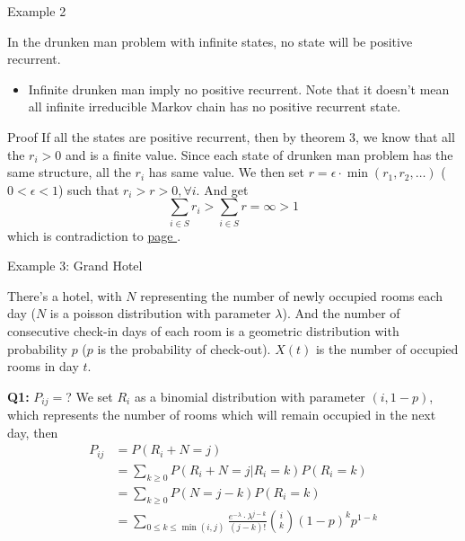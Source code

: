 \documentclass{beamer}
\begin{document}
\begin{frame}{Example 2}
	\begin{example}
	In the drunken man problem with infinite states, no state will be positive recurrent.
	\end{example}
	\begin{itemize}
	\item Infinite drunken man imply no positive recurrent.
		Note that it doesn't mean all infinite irreducible Markov chain has no positive recurrent state.
	\end{itemize}
\end{frame}

\begin{frame}{Proof}
	If all the states are positive recurrent, then by theorem 3, 
	we know that all the $r_i > 0$ and is a finite value.
	Since each state of drunken man problem has the same structure, all the $r_i$ has same value.
	We then set $r = \epsilon\cdot \min (r_1, r_2, \ldots)$ ($0 < \epsilon < 1$) such that 
	$r_i > r > 0, \forall i$.
	And get
	\[
	\sum_{i\in S} r_i > \sum_{i\in S} r = \infty > 1
	\]
	which is contradiction to \hyperlink{proportion_sum}{page \pageref{proportion_sum}}.
\end{frame}

\begin{frame}{Example 3: Grand Hotel}
	\begin{example}
	There's a hotel, with $N$ representing the number of newly occupied rooms each day ($N$ is a poisson distribution with parameter $\lambda$).
	And the number of consecutive check-in days of each room is a geometric distribution with probability $p$ ($p$ is the probability of check-out).
	$X(t)$ is the number of occupied rooms in day $t$.
	\end{example}
\end{frame}

\begin{frame}{\textbf{Q1:} $P_{ij} = $?}
	We set $R_i$ as a binomial distribution with parameter $(i, 1-p)$, which represents the number of rooms which will remain occupied in the next day, then
	\begin{align*}
	P_{ij} & = P(R_i + N = j) \\
	& = \sum_{k\geq 0} P(R_i + N = j | R_i = k)P(R_i = k) \\
	& = \sum_{k\geq 0} P(N = j-k)P(R_i = k) \\
	& = \sum_{0 \leq k \leq \min(i,j)} \frac{e^{-\lambda}\cdot \lambda^{j-k}}{(j-k)!} \binom{i}{k} (1-p)^k p^{1-k}
	\end{align*}
\end{frame}
\end{document}
